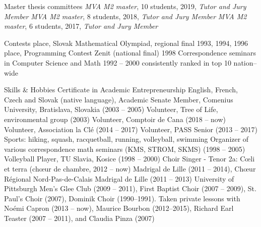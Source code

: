 \documentclass{resume}
\begin{document}
\begin{category}{Master thesis committees}
\citembullet \emph{MVA M2 master}, 10 students, 2019, \emph{Tutor and Jury Member}
\citembullet \emph{MVA M2 master}, 8 students, 2018, \emph{Tutor and Jury Member}
\citembullet \emph{MVA M2 master}, 6 students, 2017, \emph{Tutor and Jury Member}
\end{category}



\begin{category}{Contests} 
\citembullet \first place, Slovak Mathematical Olympiad, regional final 1993, 1994, 1996
\citembullet \nineth place, Programming Contest Zenit (national final) 1998
\citembullet  Correspondence seminars in Computer Science and Math  1992 -- 2000
consistently ranked in top 10 nation--wide

\end{category}


\begin{category}{Skills \& Hobbies}
\citembullet Certificate in Academic Entrepreneurship
\citembullet English, French, Czech and Slovak (native language), 
\citembullet Academic Senate Member, Comenius University, Bratislava, Slovakia (2003 -- 2005)
\citembullet Volunteer, Tree of Life, environmental group (2003)
\citembullet Volunteer, Comptoir de Cana (2018 -- now)
\citembullet Volunteer, Association la Cl\' e (2014 -- 2017)
\citembullet Volunteer, PASS Senior (2013 -- 2017)
\citembullet Sports: hiking, squash, racquetball, running, volleyball, swimming
\citembullet Organizer of various correspondence math seminars (KMS, STROM, SKMS) (1998 -- 2005)
\citembullet Volleyball Player, TU Slavia, Kosice (1998 -- 2000)
\citembullet Choir Singer - Tenor 2a: C\oe{}li et terra (ch\oe{}ur de chambre, 2012 -- now)
Madrigal de Lille (2011 -- 2014), Ch\oe{}ur R\'egional Nord-Pas-de-Calais Madrigal de Lille (2011 -- 2013)
University of Pittsburgh Men's Glee Club (2009 -- 2011), First Baptist Choir (2007 -- 2009), St.\,Paul's Choir (2007), Dominik Choir (1990--1991). %
Taken private lessons with No\' emi Capron (2013 -- now), Maurice Bourbon (2012--2015),  Richard Earl Teaster (2007 -- 2011), and Claudia Pinza (2007)
\end{category}
\end{document}
